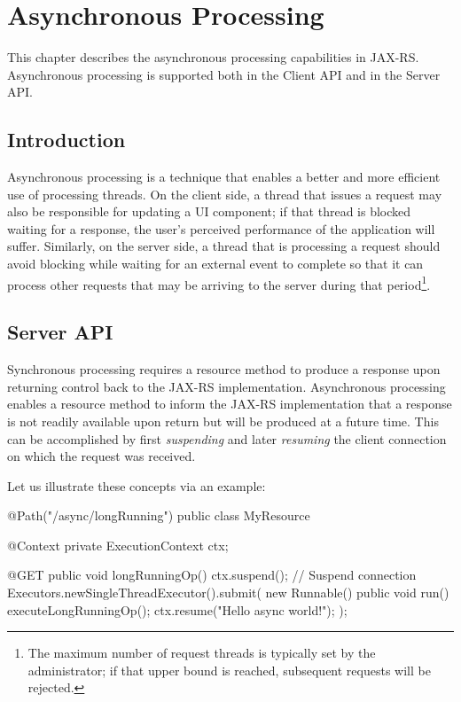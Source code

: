 \chapter{Asynchronous Processing}
\label{asynchronous_processing}

This chapter describes the asynchronous processing capabilities in JAX-RS. Asynchronous processing is supported both in the Client API and in the Server API.

\section{Introduction}
\label{introduction_async}

Asynchronous processing is a technique that enables a better and more efficient use of processing threads. On the client side, a thread that issues a request may also be responsible for updating a UI component; if that thread is blocked waiting for a response, the user's perceived performance of the application will suffer. Similarly, on the server side, a thread that is processing a request should avoid blocking while waiting for an external event to complete so that it can process other requests that may be arriving to the server during that period\footnote{The maximum number of request threads is typically set by the administrator; if that upper bound is reached, subsequent requests will be rejected.}.

\section{Server API}
\label{server_api}

Synchronous processing requires a resource method to produce a response upon returning control back to the JAX-RS implementation. Asynchronous processing enables a resource method to inform the JAX-RS implementation that a response is not readily available upon return but will be produced at a future time. This can be accomplished by first {\em suspending} and later {\em resuming} the client connection on which the request was received. 

Let us illustrate these concepts via an example:

\begin{listing}{1}
@Path("/async/longRunning")
public class MyResource {
    @Context
    private ExecutionContext ctx;
    
    @GET
    public void longRunningOp() {
        ctx.suspend();    // Suspend connection
        Executors.newSingleThreadExecutor().submit(
            new Runnable() {
                public void run() {
                    executeLongRunningOp();
                    ctx.resume("Hello async world!");
        } });
    } 
}
\end{listing}

